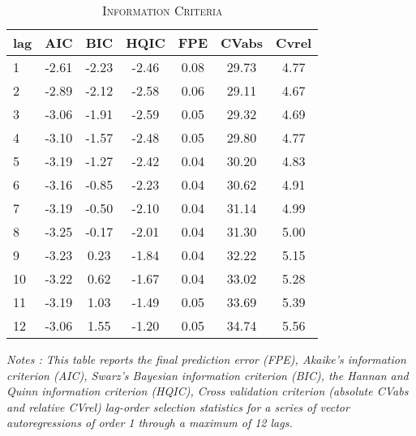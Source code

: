 \begin{table}[H] 
 \centering 
\begin{threeparttable} 
\caption{\textsc{Information Criteria}} \label{tab:IC} 
\begin{tabular*}{0.55 \textwidth }{lcccccc} 
 \toprule \toprule  
 lag & AIC & BIC & HQIC & FPE & CVabs & Cvrel \tabularnewline \midrule 1  &    -2.61 &    -2.23 &    -2.46 &     0.08 &    29.73 &     4.77 \\ 
 2  &    -2.89 &    -2.12 &    -2.58 &     0.06 &    29.11 &     4.67 \\ 
 3  &    -3.06 &    -1.91 &    -2.59 &     0.05 &    29.32 &     4.69 \\ 
 4  &    -3.10 &    -1.57 &    -2.48 &     0.05 &    29.80 &     4.77 \\ 
 5  &    -3.19 &    -1.27 &    -2.42 &     0.04 &    30.20 &     4.83 \\ 
 6  &    -3.16 &    -0.85 &    -2.23 &     0.04 &    30.62 &     4.91 \\ 
 7  &    -3.19 &    -0.50 &    -2.10 &     0.04 &    31.14 &     4.99 \\ 
 8  &    -3.25 &    -0.17 &    -2.01 &     0.04 &    31.30 &     5.00 \\ 
 9  &    -3.23 &     0.23 &    -1.84 &     0.04 &    32.22 &     5.15 \\ 
 10 &    -3.22 &     0.62 &    -1.67 &     0.04 &    33.02 &     5.28 \\ 
 11 &    -3.19 &     1.03 &    -1.49 &     0.05 &    33.69 &     5.39 \\ 
 12 &    -3.06 &     1.55 &    -1.20 &     0.05 &    34.74 &     5.56 \\ 
 \bottomrule \bottomrule 
 \end{tabular*} 
\begin{tablenotes} 
\small 
\item \emph{ \footnotesize{ Notes : This table reports the final prediction error (FPE), Akaike's information criterion (AIC), Swarz's Bayesian information criterion (BIC), the Hannan and Quinn information criterion (HQIC), Cross validation criterion (absolute CVabs and relative CVrel) lag-order selection statistics for a series of vector autoregressions of order 1 through a maximum of 12 lags.  } } 
\end{tablenotes} 
\end{threeparttable} 
\end{table} 
